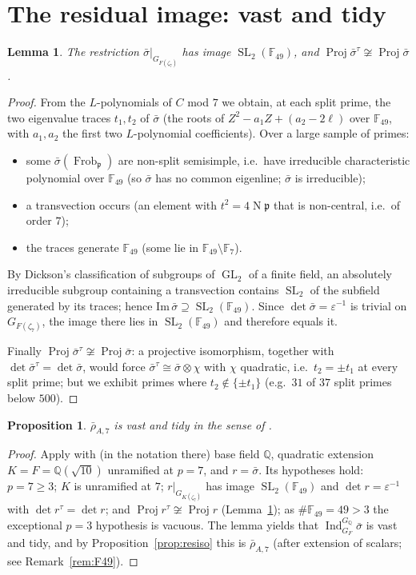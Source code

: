 \documentclass[11pt]{article}
\newtheorem{proposition}{Proposition}
\newtheorem{lemma}{Lemma}
\theoremstyle{definition}
\DeclareMathOperator{\GL}{GL}
\DeclareMathOperator{\SL}{SL}
\DeclareMathOperator{\Ind}{Ind}
\DeclareMathOperator{\Proj}{Proj}
\DeclareMathOperator{\Nm}{N}
\DeclareMathOperator{\Frob}{Frob}
\newcommand{\Q}{\mathbb{Q}}
\newcommand{\F}{\mathbb{F}}
\newcommand{\GQ}{G_{\Q}}
\newcommand{\GF}{G_F}
\newcommand{\fp}{\mathfrak{p}}
\newcommand{\rbar}{\bar\rho}
\newcommand{\sbar}{\bar\sigma}
\newcommand{\eps}{\varepsilon}
\begin{document}
\section{The residual image: vast and tidy}\label{step:image}\label{sec:image}

\begin{lemma}\label{lem:image}
The restriction $\sbar|_{G_{F(\zeta_7)}}$ has image $\SL_2(\F_{49})$, and
$\Proj\sbar^{\tau}\not\cong\Proj\sbar$.
\end{lemma}

\begin{proof}
From the $L$-polynomials of $C$ mod $7$ we obtain, at each split prime, the two
eigenvalue traces $t_1,t_2$ of $\sbar$ (the roots of $Z^2-a_1Z+(a_2-2\ell)$ over
$\F_{49}$, with $a_1,a_2$ the first two $L$-polynomial coefficients). Over a large
sample of primes:
\begin{itemize}
\item some $\sbar(\Frob_\fp)$ are non-split semisimple, i.e.\ have irreducible
      characteristic polynomial over $\F_{49}$ (so $\sbar$ has no common eigenline;
      $\sbar$ is irreducible);
\item a transvection occurs (an element with $t^2=4\Nm\fp$ that is non-central,
      i.e.\ of order $7$);
\item the traces generate $\F_{49}$ (some lie in $\F_{49}\setminus\F_7$).
\end{itemize}
By Dickson's classification of subgroups of $\GL_2$ of a finite field, an
absolutely irreducible subgroup containing a transvection contains $\SL_2$ of the
subfield generated by its traces; hence $\mathrm{Im}\,\sbar\supseteq\SL_2(\F_{49})$.
Since $\det\sbar=\eps^{-1}$ is trivial on $G_{F(\zeta_7)}$, the image there lies in
$\SL_2(\F_{49})$ and therefore equals it.

Finally $\Proj\sbar^{\tau}\not\cong\Proj\sbar$: a projective isomorphism, together
with $\det\sbar^{\tau}=\det\sbar$, would force $\sbar^{\tau}\cong\sbar\otimes\chi$
with $\chi$ quadratic, i.e.\ $t_2=\pm t_1$ at every split prime; but we exhibit
primes where $t_2\notin\{\pm t_1\}$ (e.g.\ $31$ of $37$ split primes below $500$).
\end{proof}

\begin{proposition}\label{prop:vasttidy}
$\rbar_{A,7}$ is vast and tidy in the sense of {\rm\cite[Def.\ 7.5.6, 7.5.11]{BCGP}}.
\end{proposition}

\begin{proof}
Apply \cite[Lemma 7.5.22]{BCGP} with (in the notation there) base field $\Q$,
quadratic extension $K=F=\Q(\sqrt{10})$ unramified at $p=7$, and $r=\sbar$. Its
hypotheses hold: $p=7\ge 3$; $K$ is unramified at $7$; $r|_{G_{K(\zeta_7)}}$ has
image $\SL_2(\F_{49})$ and $\det r=\eps^{-1}$ with $\det r^{\tau}=\det r$; and
$\Proj r^{\tau}\not\cong\Proj r$ (Lemma~\ref{lem:image}); as $\#\F_{49}=49>3$ the
exceptional $p=3$ hypothesis is vacuous. The lemma yields that
$\Ind_{\GF}^{\GQ}\sbar$ is vast and tidy, and by
Proposition~\ref{prop:resiso} this is $\rbar_{A,7}$ (after extension of scalars;
see Remark~\ref{rem:F49}).
\end{proof}
\end{document}
